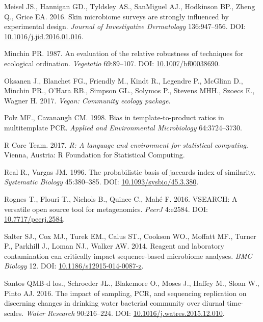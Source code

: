 \documentclass[12pt,]{article}
\begin{document}
\hypertarget{ref-Meisel2016}{}
Meisel JS., Hannigan GD., Tyldsley AS., SanMiguel AJ., Hodkinson BP.,
Zheng Q., Grice EA. 2016. Skin microbiome surveys are strongly
influenced by experimental design. \emph{Journal of Investigative
Dermatology} 136:947--956. DOI:
\href{https://doi.org/10.1016/j.jid.2016.01.016}{10.1016/j.jid.2016.01.016}.

\hypertarget{ref-bc_index_Minchin1987}{}
Minchin PR. 1987. An evaluation of the relative robustness of techniques
for ecological ordination. \emph{Vegetatio} 69:89--107. DOI:
\href{https://doi.org/10.1007/bf00038690}{10.1007/bf00038690}.

\hypertarget{ref-vegan_citation}{}
Oksanen J., Blanchet FG., Friendly M., Kindt R., Legendre P., McGlinn
D., Minchin PR., O'Hara RB., Simpson GL., Solymos P., Stevens MHH.,
Szoecs E., Wagner H. 2017. \emph{Vegan: Community ecology package}.

\hypertarget{ref-polz_bias_1998}{}
Polz MF., Cavanaugh CM. 1998. Bias in template-to-product ratios in
multitemplate PCR. \emph{Applied and Environmental Microbiology}
64:3724--3730.

\hypertarget{ref-r_citation_2017}{}
R Core Team. 2017. \emph{R: A language and environment for statistical
computing}. Vienna, Austria: R Foundation for Statistical Computing.

\hypertarget{ref-Real1996}{}
Real R., Vargas JM. 1996. The probabilistic basis of jaccards index of
similarity. \emph{Systematic Biology} 45:380--385. DOI:
\href{https://doi.org/10.1093/sysbio/45.3.380}{10.1093/sysbio/45.3.380}.

\hypertarget{ref-vsearch_Rognes_2016}{}
Rognes T., Flouri T., Nichols B., Quince C., Mahé F. 2016. VSEARCH: A
versatile open source tool for metagenomics. \emph{PeerJ} 4:e2584. DOI:
\href{https://doi.org/10.7717/peerj.2584}{10.7717/peerj.2584}.

\hypertarget{ref-contamination_Salter2014}{}
Salter SJ., Cox MJ., Turek EM., Calus ST., Cookson WO., Moffatt MF.,
Turner P., Parkhill J., Loman NJ., Walker AW. 2014. Reagent and
laboratory contamination can critically impact sequence-based microbiome
analyses. \emph{BMC Biology} 12. DOI:
\href{https://doi.org/10.1186/s12915-014-0087-z}{10.1186/s12915-014-0087-z}.

\hypertarget{ref-BautistadelosSantos2016}{}
Santos QMB-d los., Schroeder JL., Blakemore O., Moses J., Haffey M.,
Sloan W., Pinto AJ. 2016. The impact of sampling, PCR, and sequencing
replication on discerning changes in drinking water bacterial community
over diurnal time-scales. \emph{Water Research} 90:216--224. DOI:
\href{https://doi.org/10.1016/j.watres.2015.12.010}{10.1016/j.watres.2015.12.010}.
\end{document}
